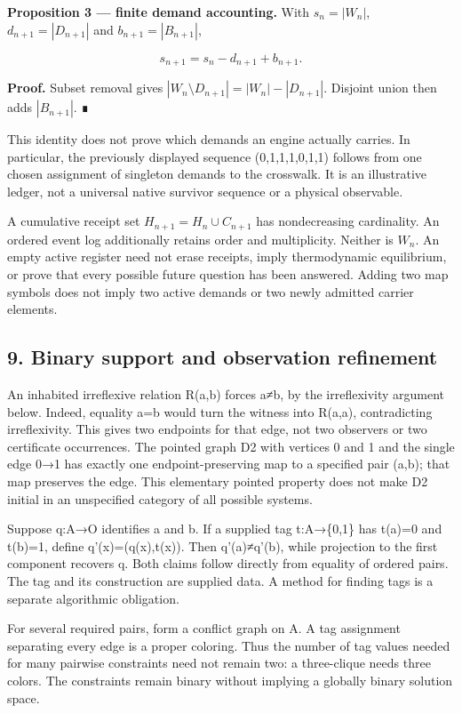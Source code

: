 \documentclass[
  11pt,
]{article}
\begin{document}
\textbf{Proposition 3 --- finite demand accounting.} With \(s_n=|W_n|\),
\(d_{n+1}=|D_{n+1}|\) and \(b_{n+1}=|B_{n+1}|\),

\[
s_{n+1}=s_n-d_{n+1}+b_{n+1}.
\]

\textbf{Proof.} Subset removal gives
\(|W_n\setminus D_{n+1}|=|W_n|-|D_{n+1}|\). Disjoint union then adds
\(|B_{n+1}|\). ∎

This identity does not prove which demands an engine actually carries.
In particular, the previously displayed sequence (0,1,1,1,0,1,1) follows
from one chosen assignment of singleton demands to the crosswalk. It is
an illustrative ledger, not a universal native survivor sequence or a
physical observable.

A cumulative receipt set \(H_{n+1}=H_n\cup C_{n+1}\) has nondecreasing
cardinality. An ordered event log additionally retains order and
multiplicity. Neither is \(W_n\). An empty active register need not
erase receipts, imply thermodynamic equilibrium, or prove that every
possible future question has been answered. Adding two map symbols does
not imply two active demands or two newly admitted carrier elements.

\subsection{9. Binary support and observation
refinement}\label{binary-support-and-observation-refinement}

An inhabited irreflexive relation R(a,b) forces a≠b, by the
irreflexivity argument below. Indeed, equality a=b would turn the
witness into R(a,a), contradicting irreflexivity. This gives two
endpoints for that edge, not two observers or two certificate
occurrences. The pointed graph D2 with vertices 0 and 1 and the single
edge 0→1 has exactly one endpoint-preserving map to a specified pair
(a,b); that map preserves the edge. This elementary pointed property
does not make D2 initial in an unspecified category of all possible
systems.

Suppose q:A→O identifies a and b. If a supplied tag t:A→\{0,1\} has
t(a)=0 and t(b)=1, define q'(x)=(q(x),t(x)). Then q'(a)≠q'(b), while
projection to the first component recovers q. Both claims follow
directly from equality of ordered pairs. The tag and its construction
are supplied data. A method for finding tags is a separate algorithmic
obligation.

For several required pairs, form a conflict graph on A. A tag assignment
separating every edge is a proper coloring. Thus the number of tag
values needed for many pairwise constraints need not remain two: a
three-clique needs three colors. The constraints remain binary without
implying a globally binary solution space.
\end{document}
